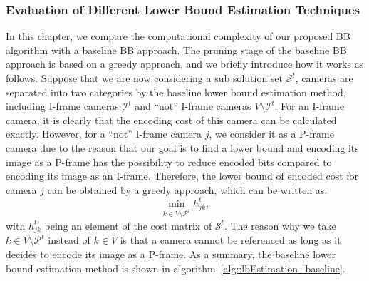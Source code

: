 \subsubsection{Evaluation of Different Lower Bound Estimation Techniques}
%
In this chapter, we compare the computational complexity of our proposed BB algorithm with a baseline BB approach.
The pruning stage of the baseline BB approach is based on a greedy approach, and we briefly introduce how it works as follows.
Suppose that we are now considering a sub solution set $\mathcal{S}^t$, cameras are separated into two categories by the baseline lower bound estimation method, including I-frame cameras $\mathcal{I}^t$ and ``not'' I-frame cameras $V \setminus \mathcal{I}^t$.
For an I-frame camera, it is clearly that the encoding cost of this camera can be calculated exactly.
However, for a ``not'' I-frame camera $j$, we consider it as a P-frame camera due to the reason that our goal is to find a lower bound and encoding its image as a P-frame has the possibility to reduce encoded bits compared to encoding its image as an I-frame.
Therefore, the lower bound of encoded cost for camera $j$ can be obtained by a greedy approach, which can be written as:
\begin{equation}
\underset{k \in V \setminus \mathcal{P}^t}{\min} h_{jk}^t,
\label{eq::lbGreedy}
\end{equation}
with $h_{jk}^t$ being an element of the cost matrix of $\mathcal{S}^t$.
The reason why we take $k \in V \setminus \mathcal{P}^t$ instead of $k \in V$ is that a camera cannot be referenced as long as it decides to encode its image as a P-frame.
As a summary, the baseline lower bound estimation method is shown in algorithm~\ref{alg::lbEstimation_baseline}.
%
\IncMargin{1em}

